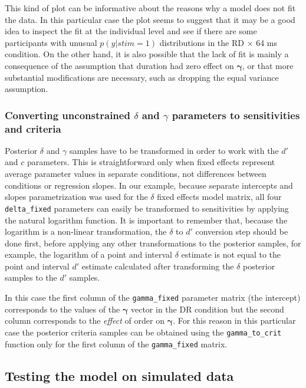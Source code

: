 \documentclass[oneside,a4paper]{article}
\begin{document}
This kind of plot can be informative about the reasons why a model
does not fit the data. In this particular case the plot seems to
suggest that it may be a good idea to inspect the fit at the
individual level and see if there are some participants with unusual
$p(y|stim=1)$ distributions in the RD $\times$ 64 ms condition. On the
other hand, it is also possible that the lack of fit is mainly a
consequence of the assumption that duration had zero effect on
$\bm{\gamma}$, or that more substantial modifications are necessary,
such as dropping the equal variance assumption.

\subsubsection{Converting unconstrained $\delta$ and $\gamma$
  parameters to sensitivities and criteria}

Posterior $\delta$ and $\gamma$ samples have to be transformed in
order to work with the $d'$ and $c$ parameters. This is
straightforward only when fixed effects represent average parameter
values in separate conditions, not differences between conditions or
regression slopes. In our example, because separate intercepts and
slopes parametrization was used for the $\delta$ fixed effects model
matrix, all four \texttt{delta\_fixed} parameters can easily be
transformed to sensitivities by applying the natural logarithm
function. It is important to remember that, because the logarithm is a
non-linear transformation, the $\delta$ to $d'$ conversion step should
be done first, before
applying any other transformations to the posterior samples, for
example, the logarithm of a point and interval $\delta$ estimate is
not equal to the point and interval $d'$ estimate calculated after
transforming the $\delta$ posterior samples to the $d'$ samples.

In this case the first column of the \texttt{gamma\_fixed} parameter
matrix (the intercept) corresponds to the values of the $\bm{\gamma}$
vector in the DR condition but the second column corresponds to the
\emph{effect} of order on $\bm{\gamma}$. For this reason in this
particular case the posterior criteria samples can be obtained using
the \texttt{gamma\_to\_crit} function only for the first column of the
\texttt{gamma\_fixed} matrix.

\subsection{Testing the model on simulated data}
\end{document}
